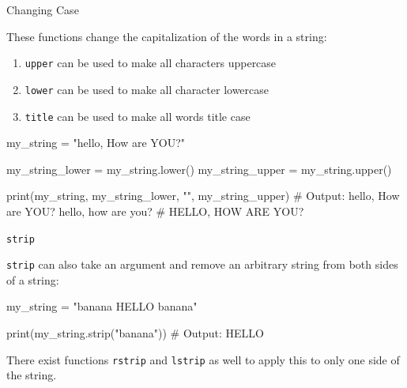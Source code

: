 \begin{frame}[fragile]{Changing Case}

    These functions change the capitalization of the words in a string:

    \begin{enumerate}

        \item \texttt{upper} can be used to make all characters uppercase
        \item \texttt{lower} can be used to make all character lowercase
        \item \texttt{title} can be used to make all words title case

    \end{enumerate}

    \begin{pythoncode}

my_string = "hello, How are YOU?"

my_string_lower = my_string.lower()
my_string_upper = my_string.upper()

print(my_string, my_string_lower, "\n", my_string_upper)
# Output: hello, How are YOU? hello, how are you? 
#          HELLO, HOW ARE YOU?

    \end{pythoncode}


\end{frame}

\begin{frame}[fragile]{\texttt{strip}}

    \texttt{strip} can also take an argument and remove an arbitrary string from both sides of a string:

    \begin{pythoncode}

my_string = "banana HELLO banana"

print(my_string.strip("banana"))
# Output: HELLO 
    
    \end{pythoncode}

    There exist functions \texttt{rstrip} and \texttt{lstrip} as well to apply this to only one side of the string.

    

\end{frame}


